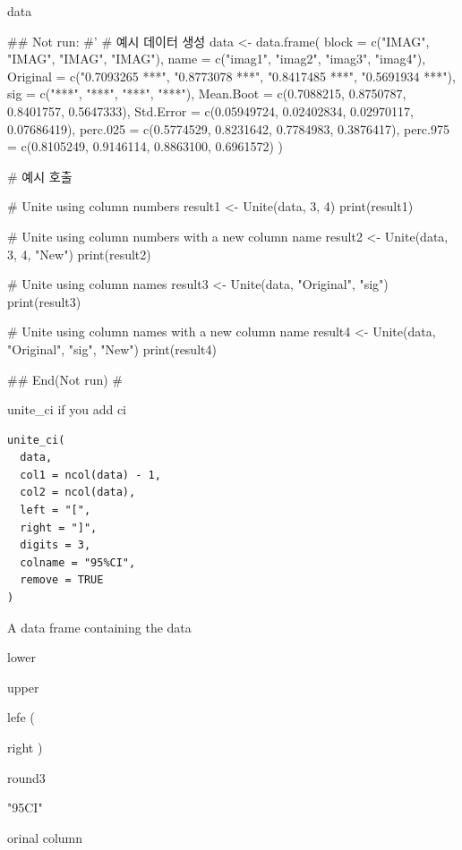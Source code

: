 \documentclass[a4paper]{book}
\begin{document}
%
\begin{Value}
data
\end{Value}
%
\begin{Examples}
\begin{ExampleCode}
## Not run: 
#'
# 예시 데이터 생성
data <- data.frame(
  block = c("IMAG", "IMAG", "IMAG", "IMAG"),
  name = c("imag1", "imag2", "imag3", "imag4"),
  Original = c("0.7093265 ***", "0.8773078 ***", "0.8417485 ***", "0.5691934 ***"),
  sig = c("***", "***", "***", "***"),
  Mean.Boot = c(0.7088215, 0.8750787, 0.8401757, 0.5647333),
  Std.Error = c(0.05949724, 0.02402834, 0.02970117, 0.07686419),
  perc.025 = c(0.5774529, 0.8231642, 0.7784983, 0.3876417),
  perc.975 = c(0.8105249, 0.9146114, 0.8863100, 0.6961572)
)

# 예시 호출

# Unite using column numbers
result1 <- Unite(data, 3, 4)
print(result1)

# Unite using column numbers with a new column name
result2 <- Unite(data, 3, 4, "New")
print(result2)

# Unite using column names
result3 <- Unite(data, "Original", "sig")
print(result3)

# Unite using column names with a new column name
result4 <- Unite(data, "Original", "sig", "New")
print(result4)



## End(Not run)
#
\end{ExampleCode}
\end{Examples}
%
\begin{Description}
unite\_ci if you add ci
\end{Description}
%
\begin{Usage}
\begin{verbatim}
unite_ci(
  data,
  col1 = ncol(data) - 1,
  col2 = ncol(data),
  left = "[",
  right = "]",
  digits = 3,
  colname = "95%CI",
  remove = TRUE
)
\end{verbatim}
\end{Usage}
%
\begin{Arguments}
\begin{ldescription}
\item[\code{data}] A data frame containing the data

\item[\code{col1}] lower

\item[\code{col2}] upper

\item[\code{left}] lefe (

\item[\code{right}] right )

\item[\code{digits}] round3

\item[\code{colname}] "95CI"

\item[\code{remove}] orinal column
\end{ldescription}
\end{Arguments}
\end{document}
